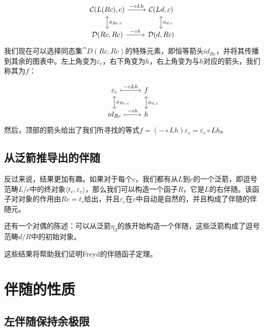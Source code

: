 \documentclass[DaoFP]{subfiles}
\begin{document}
    \[
        \begin{tikzcd}
            \mathcal{C}(L (R c), c)
            \arrow[d, leftrightarrow, "\phi_{R c, c}"]
            \arrow[r, "- \circ L h"]
            &
            \mathcal{C}(L d, c)
            \arrow[d, leftrightarrow, "\phi_{d, c}"]
            \\
            \mathcal{D}(R c, R c)
            \arrow[r, "- \circ h"]
            & \mathcal{D}(d, R c)
        \end{tikzcd}
    \]
    我们现在可以选择同态集$\cat D(R c, R c)$的特殊元素，即恒等箭头$id_{R c}$，并将其传播到其余的图表中。左上角变为$\varepsilon_c$，右下角变为$h$，右上角变为与$h$对应的箭头，我们称其为$f$：

    \[
        \begin{tikzcd}
            \varepsilon_c
            \arrow[d, leftrightarrow, "\phi_{R c, c}"]
            \arrow[r, maps to, "- \circ L h"]
            &
            f
            \arrow[d, leftrightarrow, "\phi_{d, c}"]
            \\
            id_{R c}
            \arrow[r, maps to, "- \circ h"]
            & h
        \end{tikzcd}
    \]
    然后，顶部的箭头给出了我们所寻找的等式$f = (- \circ L h) \varepsilon_c = \varepsilon_c \circ L h$。

    \subsection{从泛箭推导出的伴随}

    反过来说，结果更加有趣。如果对于每个$c$，我们都有从$L$到$c$的一个泛箭，即逗号范畴$L/c$中的终对象$\langle t_c, \varepsilon_c \rangle$，那么我们可以构造一个函子$R$，它是$L$的右伴随。该函子对对象的作用由$R c = t_c$给出，并且$\varepsilon_c$在$c$中自动是自然的，并且构成了伴随的伴随元。

    还有一个对偶的陈述：可以从泛箭$\eta_d$的族开始构造一个伴随，这些泛箭构成了逗号范畴$d/R$中的初始对象。

    这些结果将帮助我们证明Freyd的伴随函子定理。

    \section{伴随的性质}

    \subsection{左伴随保持余极限}
\end{document}
